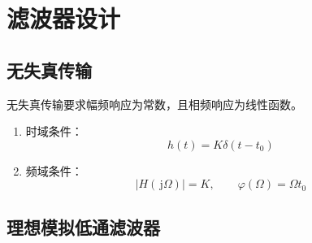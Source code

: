 \documentclass[UTF8,fontset=fandol,zihao=5]{ctexart}
\newcommand{\jj}{\,\mathrm{j}}
\begin{document}
\section{滤波器设计}

\subsection{无失真传输}

无失真传输要求幅频响应为常数，且相频响应为线性函数。

\begin{enumerate}
  \item 时域条件：
  \[
  h(t)=K\delta(t-t_0)
  \]
  \item 频域条件：
  \[
  \left|H(\jj\varOmega)\right|=K, \qquad \varphi(\varOmega)=\varOmega t_0
  \]
\end{enumerate}

\subsection{理想模拟低通滤波器}
\end{document}
